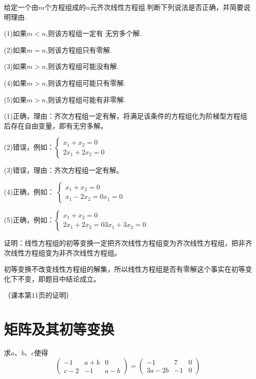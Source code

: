 \documentclass[a4paper]{report}
\begin{document}
\EX 给定一个由$m$个方程组成的$n$元齐次线性方程组.判断下列说法是否正确，并简要说明理由.

(1)如果$m< n$,则该方程组一定有 无穷多个解.

(2)如果$m=n$,则该方程组只有零解.

(3)如果$m>n$,则该方程组可能没有解.

(4)如果$m> n$,则该方程组可能只有零解.

(5)如果$m> n$,则该方程组可能有非零解.

\begin{jie}
(1)正确，理由：齐次方程组一定有解，将满足该条件的方程组化为阶梯型方程组后存在自由变量，即有无穷多解。

(2)错误，例如：$
\begin{cases}
x_1+x_2=0\\
2x_1+2x_2=0
\end{cases}
$

(3)错误，理由：齐次方程组一定有解。

(4)正确，例如：
$
\begin{cases}
x_1+x_2=0\\
x_1-2x_2=0
x_1=0
\end{cases}
$

(5)正确，例如：$
\begin{cases}
x_1+x_2=0\\
2x_1+2x_2=0
3x_1+3x_2=0
\end{cases}
$
\end{jie}

\EX 证明：线性方程组的初等变换一定把齐次线性方程组变为齐次线性方程组，把非齐次线性方程组变为非齐次线性方程组。

\begin{zhengming}
初等变换不改变线性方程组的解集，所以线性方程组是否有零解这个事实在初等变化下不变，即题目中结论成立。

（课本第11页的证明）
\end{zhengming}

\clearpage
\section{矩阵及其初等变换}
\EX 求$a$、$b$、$c$使得
\begin{equation*}
\begin{pmatrix}
-1&a+b&0\\ c-2&-1&a-b
\end{pmatrix}=\begin{pmatrix}
-1&7&0\\ 3a-2b&-1&0
\end{pmatrix}
\end{equation*}
\end{document}
